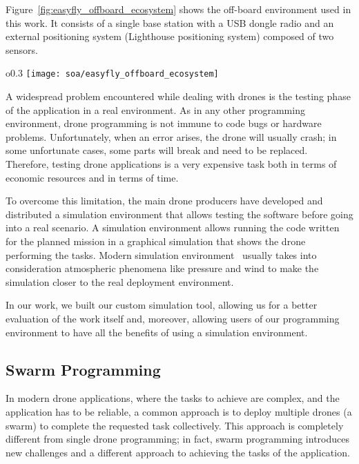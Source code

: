 Figure~\ref{fig:easyfly_offboard_ecosystem} shows the off-board environment used in this work. 
It consists of a single base station with a USB dongle radio and an external positioning system (Lighthouse positioning system) composed of two sensors. 

\begin{wrapfigure}{o}{0.3\textwidth}
    \texttt{[image: soa/easyfly\_offboard\_ecosystem]}
    \caption{EasyFly off-board ecosystem}\label{fig:easyfly_offboard_ecosystem}
\end{wrapfigure}

A widespread problem encountered while dealing with drones is the testing phase of the application in a real environment. 
As in any other programming environment, drone programming is not immune to code bugs or hardware problems. 
Unfortunately, when an error arises, the drone will usually crash; in some unfortunate cases, some parts will break and need to be replaced. 
Therefore, testing drone applications is a very expensive task both in terms of economic resources and in terms of time. 

To overcome this limitation, the main drone producers have developed and distributed a simulation environment that allows 
testing the software before going into a real scenario. 
A simulation environment allows running the code written for the planned mission in a graphical simulation that shows the drone performing the tasks. 
Modern simulation environment~\cite{sphinx, DIJflightSimulator} usually takes into consideration atmospheric phenomena like pressure and wind to make the simulation 
closer to the real deployment environment.

In our work, we built our custom simulation tool, allowing us for a better evaluation of the work itself and, moreover, allowing  
users of our programming environment to have all the benefits of using a simulation environment.

\subsection{Swarm Programming}\label{subsec:swarm_programming}
In modern drone applications, where the tasks to achieve are complex, and the application has to be reliable, a common approach is 
to deploy multiple drones (a swarm) to complete the requested task collectively. This approach is completely different from single 
drone programming; in fact, swarm programming introduces new challenges and a different approach to achieving the tasks of the application.

